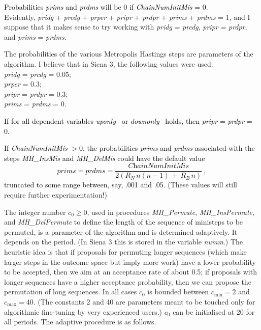 \documentclass[a4paper,12pt,fleqn]{article}
\newcommand{\nnm}[1]{\textsf{\small\textit{#1}\ }}
\newcommand{\addce}[1]{{\textcolor[named]{Black}{#1}}}
\newcommand{\addcf}[1]{{\textcolor[named]{Black}{#1}}}
\begin{document}
\noindent
\addcf{
Probabilities  \textit{prims} and  \textit{prdms}
will be 0 if \textit{ChainNumInitMis} = 0.}\\
Evidently, \textit{pridg} + \textit{prcdg} + \textit{prper}
+ \textit{pripr} + \textit{prdpr} + \textit{prims} + \textit{prdms} = 1,
and I suppose that it makes sense to try working with
\textit{pridg} = \textit{prcdg}, \textit{pripr} = \textit{prdpr},
and \textit{prims} = \textit{prdms}.

The probabilities of the various Metropolis Hastings steps
are parameters of the algorithm.
I believe that in Siena 3, the following values were used:\\
\textit{pridg} = \textit{prcdg} = 0.05;\\
\textit{prper} = 0.3;\\
\textit{pripr} = \textit{prdpr} = 0.3;\\
\textit{prims} = \textit{prdms} = 0.

\addce{If for all dependent variables \nnm{uponly} or \nnm{downonly} holds,
then \textit{pripr} = \textit{prdpr} = 0.}

\addcf{
If \textit{ChainNumInitMis} $> 0$, the
probabilities \textit{prims} and \textit{prdms} associated with the steps
\textit{MH\_InsMis} and \textit{MH\_DelMis}
could have the default value
\[
\textit{prims} = \textit{prdms}
   = \frac{\textit{ChainNumInitMis}}{2(R_N\, n(n-1) \,+\, R_B \,n)} \
,
\]
truncated to some range between, say, .001 and .05}.
(These values will still require further experimentation!)

The integer number $c_0 \geq 0$,
 used in procedures
\textit{MH\_Permute}, \textit{MH\_InsPermute}, and \textit{MH\_DelPermute}
to define the length of the sequence of ministeps to be permuted,
is a parameter of the algorithm and is determined adaptively.
It depends on the period.
(In Siena 3 this is stored in the variable \textit{numm}.)
The heuristic idea is that if proposals for permuting longer sequences
(which make larger steps in the outcome space but imply more work) have
a lower probability to be accepted, then we aim at an acceptance rate
of about 0.5; if proposals with longer sequences have a higher
acceptance probability, then we can propose the permutation of long sequences.
In all cases $c_0$ is bounded between $c_\text{min} = 2$ and $c_\text{max} = 40$.
(The constants 2 and 40 are parameters meant to be touched only
for algorithmic fine-tuning by very experienced users.)
$c_0$ can be initialised at 20 for all periods.
The adaptive procedure is as follows.\\
\medskip
\end{document}
